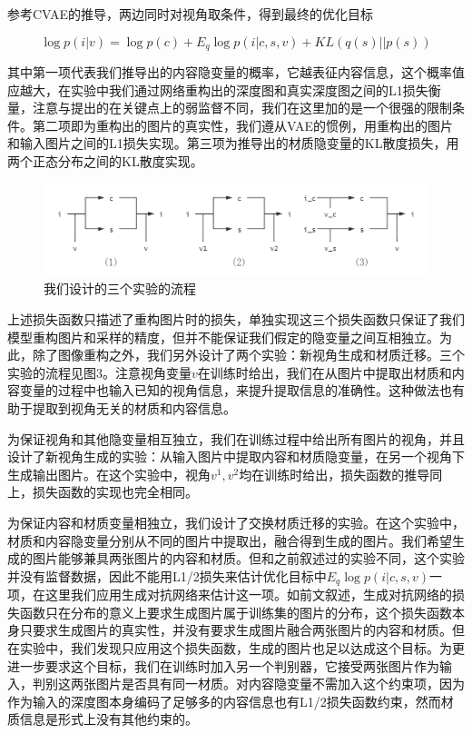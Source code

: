 \documentclass[UTF8,openany,AutoFakeBold,AutoFakeSlant,cs4size]{ctexbook}
\begin{document}
参考CVAE的推导，两边同时对视角取条件，得到最终的优化目标

\begin{equation}
	\log p(i | v)= \log p(c) + E_{q} \log p(i | c, s, v) + KL(q(s) || p(s))
\end{equation}

其中第一项代表我们推导出的内容隐变量的概率，它越表征内容信息，这个概率值应越大，在实验中我们通过网络重构出的深度图和真实深度图之间的L1损失衡量，注意与\cite{Wu2019DisentanglingCA}提出的在关键点上的弱监督不同，我们在这里加的是一个很强的限制条件。第二项即为重构出的图片的真实性，我们遵从VAE的惯例，用重构出的图片和输入图片之间的L1损失实现。第三项为推导出的材质隐变量的KL散度损失，用两个正态分布之间的KL散度实现。

\begin{figure}[h]
\centering
\includegraphics[width=15cm]{./images/my_model.png}
\caption{我们设计的三个实验的流程}
\label{fig:sample}
\end{figure}

上述损失函数只描述了重构图片时的损失，单独实现这三个损失函数只保证了我们模型重构图片和采样的精度，但并不能保证我们假定的隐变量之间互相独立。为此，除了图像重构之外，我们另外设计了两个实验：新视角生成和材质迁移。三个实验的流程见图3。注意视角变量$v$在训练时给出，我们在从图片中提取出材质和内容变量的过程中也输入已知的视角信息，来提升提取信息的准确性。这种做法也有助于提取到视角无关的材质和内容信息。

为保证视角和其他隐变量相互独立，我们在训练过程中给出所有图片的视角，并且设计了新视角生成的实验：从输入图片中提取内容和材质隐变量，在另一个视角下生成输出图片。在这个实验中，视角$v^{1}, v^{2}​$均在训练时给出，损失函数的推导同上，损失函数的实现也完全相同。

为保证内容和材质变量相独立，我们设计了交换材质迁移的实验。在这个实验中，材质和内容隐变量分别从不同的图片中提取出，融合得到生成的图片。我们希望生成的图片能够兼具两张图片的内容和材质。但和之前叙述过的实验不同，这个实验并没有监督数据，因此不能用L1/2损失来估计优化目标中$E_{q} \log p(i | c, s, v)$一项，在这里我们应用生成对抗网络来估计这一项。如前文叙述，生成对抗网络的损失函数只在分布的意义上要求生成图片属于训练集的图片的分布，这个损失函数本身只要求生成图片的真实性，并没有要求生成图片融合两张图片的内容和材质。但在实验中，我们发现只应用这个损失函数，生成的图片也足以达成这个目标。为更进一步要求这个目标，我们在训练时加入另一个判别器，它接受两张图片作为输入，判别这两张图片是否具有同一材质。对内容隐变量不需加入这个约束项，因为作为输入的深度图本身编码了足够多的内容信息也有L1/2损失函数约束，然而材质信息是形式上没有其他约束的。
\end{document}
